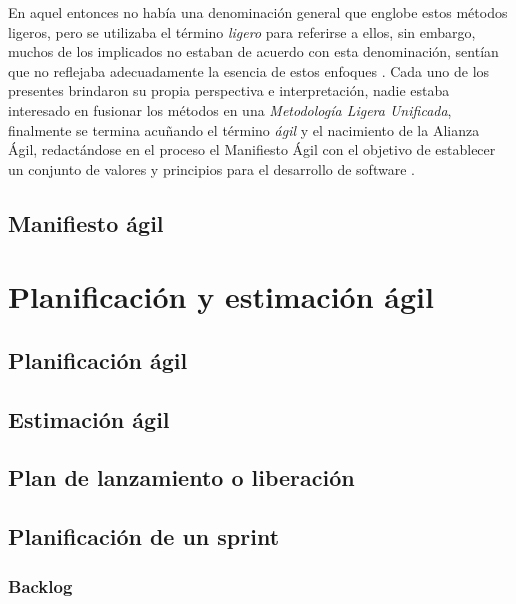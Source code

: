   En aquel entonces no había una denominación general que englobe estos métodos ligeros, pero se utilizaba el término \textit{ligero} para referirse a ellos, sin embargo, muchos de los implicados no estaban de acuerdo con esta denominación, sentían que no reflejaba adecuadamente la esencia de estos enfoques \cite{fowler:2005,cockburn:2002}. Cada uno de los presentes brindaron su propia perspectiva e interpretación, nadie estaba interesado en fusionar los métodos en una \textit{Metodología Ligera Unificada}, finalmente se termina acuñando el término \textit{ágil} y el nacimiento de la Alianza Ágil, redactándose en el proceso el Manifiesto Ágil con el objetivo de establecer un conjunto de valores y principios para el desarrollo de software \cite{cockburn:2002}.
  \subsection{Manifiesto ágil}

\section{Planificación y estimación ágil}
  \subsection{Planificación ágil}
  \subsection{Estimación ágil}
  \subsection{Plan de lanzamiento o liberación}
  \subsection{Planificación de un sprint}
    \subsubsection{Backlog}

